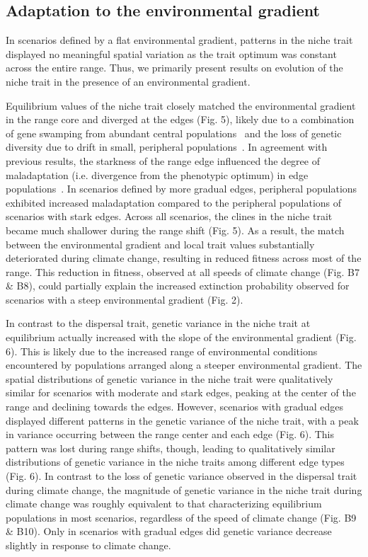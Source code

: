 \documentclass[11pt]{article}
\begin{document}
\subsection*{Adaptation to the environmental gradient} 
In scenarios defined by a flat environmental gradient, patterns in the niche trait displayed no meaningful spatial variation as the trait optimum was constant across the entire range. Thus, we primarily present results on evolution of the niche trait in the presence of an environmental gradient. 

Equilibrium values of the niche trait closely matched the environmental gradient in the range core and diverged at the edges (Fig. 5), likely due to a combination of gene swamping from abundant central populations~\citep{kirkpatrick1997evolution} and the loss of genetic diversity due to drift in small, peripheral populations~\citep{polechova2018sky, polechova2015limits}. In agreement with previous results, the starkness of the range edge influenced the degree of maladaptation (i.e. divergence from the phenotypic optimum) in edge populations~\citep{garcia1997genetic}. In scenarios defined by more gradual edges, peripheral populations exhibited increased maladaptation compared to the peripheral populations of scenarios with stark edges. Across all scenarios, the clines in the niche trait became much shallower during the range shift (Fig. 5). As a result, the match between the environmental gradient and local trait values substantially deteriorated during climate change, resulting in reduced fitness across most of the range. This reduction in fitness, observed at all speeds of climate change (Fig. B7 \& B8), could partially explain the increased extinction probability observed for scenarios with a steep environmental gradient (Fig. 2). 

In contrast to the dispersal trait, genetic variance in the niche trait at equilibrium actually increased with the slope of the environmental gradient (Fig. 6). This is likely due to the increased range of environmental conditions encountered by populations arranged along a steeper environmental gradient. The spatial distributions of genetic variance in the niche trait were qualitatively similar for scenarios with moderate and stark edges, peaking at the center of the range and declining towards the edges. However, scenarios with gradual edges displayed different patterns in the genetic variance of the niche trait, with a peak in variance occurring between the range center and each edge (Fig. 6). This pattern was lost during range shifts, though, leading to qualitatively similar distributions of genetic variance in the niche traits among different edge types (Fig. 6). In contrast to the loss of genetic variance observed in the dispersal trait during climate change, the magnitude of genetic variance in the niche trait during climate change was roughly equivalent to that characterizing equilibrium populations in most scenarios, regardless of the speed of climate change (Fig. B9 \& B10). Only in scenarios with gradual edges did genetic variance decrease slightly in response to climate change.
\end{document}
